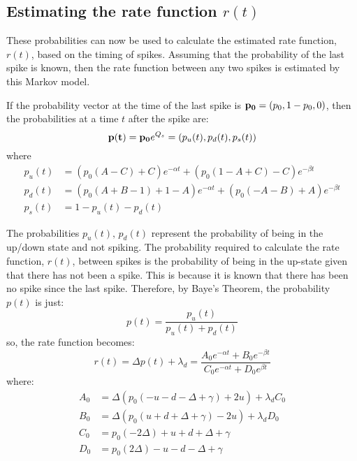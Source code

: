\subsection{Estimating the rate function $r(t)$}

These probabilities can now be used to calculate the estimated rate function, $r(t)$, based on the timing of spikes.  Assuming that the probability of the last spike is known, then the rate function between any two spikes is estimated by this Markov model. 

If the probability vector at the time of the last spike is ${\bf p_0}=(p_0, 1-p_0,0)$, then the probabilities at a time $t$ after the spike are:
\begin{equation}
{\bf p(t)} = {\bf p_0}e^{Q_s} = (p_u(t),p_d(t),p_s(t))
\end{equation}
where
\begin{equation}
\begin{split}
p_u(t) &= (p_0(A-C)+C)e^{-\alpha t}+(p_0(1-A+C)-C)e^{-\beta t}\\
p_d(t) &= (p_0(A+B-1)+1-A)e^{-\alpha t}+(p_0(-A-B)+A)e^{-\beta t}\\
p_s(t) &= 1 - p_u(t) - p_d(t)
\end{split}
\end{equation}

The probabilities $p_u(t), \,p_d(t)$ represent the probability of being in the up/down state and not spiking.  The probability required to calculate the rate function, $r(t)$, between spikes is the probability of being in the up-state given that there has not been a spike.  This is because it is known that there has been no spike since the last spike.  Therefore, by Baye's Theorem, the probability $p(t)$ is just:
\begin{equation}
p(t)  = \frac{p_u(t)}{p_u(t) + p_d(t)}
\end{equation}
so, the rate function becomes:
\begin{equation}\label{roft}
r(t) = \Delta p(t) + \lambda_d = \frac{A_0e^{-\alpha t}+B_0e^{-\beta t}}{C_0e^{-\alpha t} + D_0e^{\beta t}}
\end{equation}
where:
\begin{equation}
\begin{split}
\label{abcd}
A_0 & = \Delta(p_0(-u-d-\Delta + \gamma)+2u)+\lambda_dC_0\\
B_0 & =\Delta(p_0(u+d+\Delta + \gamma)-2u)+\lambda_dD_0\\
C_0 & = p_0(-2\Delta)+u+d+\Delta+\gamma\\
D_0 & = p_0(2\Delta) -u-d-\Delta + \gamma
\end{split}
\end{equation}

